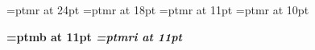 

\enablehyperlinks
\raggedbottom

\pdfpagewidth=8.5in
\pdfpageheight=11in

\hoffset=-0.25in
\voffset=-0.25in
\vsize=9.50in
\hsize=7.00in

\baselineskip=12pt



\font\large=ptmr at 24pt
\font\medium=ptmr at 18pt
\font\small=ptmr at 11pt
\font\tiny=ptmr at 10pt

\font\bf=ptmb at 11pt
\font\it=ptmri at 11pt

\newdimen\center
\newbox\textbox
\newdimen\centertext
\newbox\bulletlenbox




\def\centered#1{

    \center=\hsize
    \divide \center by 2

    \noindent\hbox{#1}\setbox\textbox\lastbox

    \centertext=\wd\textbox
    \divide \centertext by 2

    \advance \center by -\centertext

    \noindent\hskip\center #1
}




\def\section#1{
    \begingroup
    \penalty-1000
    \vskip 5mm \noindent\tiny #1 \vskip1mm\hrule \vskip2mm
    \endgroup
}




\long{}


